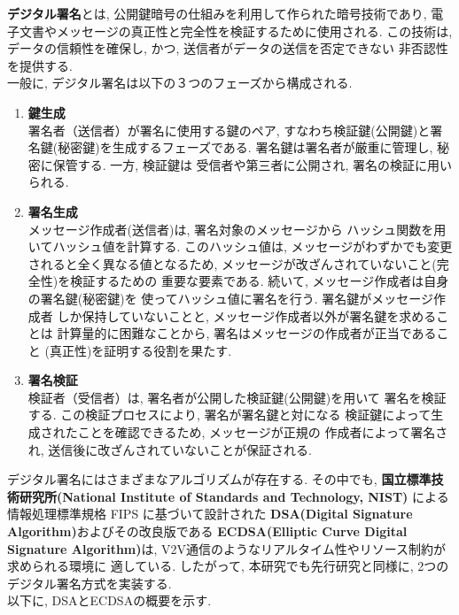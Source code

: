 \textbf{デジタル署名}とは, 公開鍵暗号の仕組みを利用して作られた暗号技術であり, 
電子文書やメッセージの真正性と完全性を検証するために使用される. 
この技術は, データの信頼性を確保し, かつ, 送信者がデータの送信を否定できない
非否認性を提供する.\\
\indent 一般に, デジタル署名は以下の３つのフェーズから構成される.

\begin{enumerate}
  \item \textbf{鍵生成}\\
  \indent 署名者（送信者）が署名に使用する鍵のペア, 
  すなわち検証鍵(公開鍵)と署名鍵(秘密鍵)を生成するフェーズである. 
  署名鍵は署名者が厳重に管理し, 秘密に保管する. 一方, 検証鍵は
  受信者や第三者に公開され, 署名の検証に用いられる.
  \item \textbf{署名生成}\\
  \indent メッセージ作成者(送信者)は, 署名対象のメッセージから
  ハッシュ関数を用いてハッシュ値を計算する. このハッシュ値は, 
  メッセージがわずかでも変更されると全く異なる値となるため, 
  メッセージが改ざんされていないこと(完全性)を検証するための
  重要な要素である. 続いて, メッセージ作成者は自身の署名鍵(秘密鍵)を
  使ってハッシュ値に署名を行う. 署名鍵がメッセージ作成者
  しか保持していないことと, メッセージ作成者以外が署名鍵を求めることは
  計算量的に困難なことから, 署名はメッセージの作成者が正当であること
  (真正性)を証明する役割を果たす. 
  \item \textbf{署名検証}\\
  \indent 検証者（受信者）は, 署名者が公開した検証鍵(公開鍵)を用いて
  署名を検証する. この検証プロセスにより, 署名が署名鍵と対になる
  検証鍵によって生成されたことを確認できるため, メッセージが正規の
  作成者によって署名され, 送信後に改ざんされていないことが保証される.
\end{enumerate}

デジタル署名にはさまざまなアルゴリズムが存在する. その中でも,    
\textbf{国立標準技術研究所(National Institute of Standards and Technology, NIST)}
による情報処理標準規格 FIPS に基づいて設計された
\textbf{DSA(Digital Signature Algorithm)}およびその改良版である
\textbf{ECDSA(Elliptic Curve Digital Signature Algorithm)}は, 
V2V通信のようなリアルタイム性やリソース制約が求められる環境に
適している. したがって, 本研究でも先行研究\cite{shinato}と同様に, 
2つのデジタル署名方式を実装する. \\
以下に, DSAとECDSAの概要を示す. \\[1em] 


\\

\\
